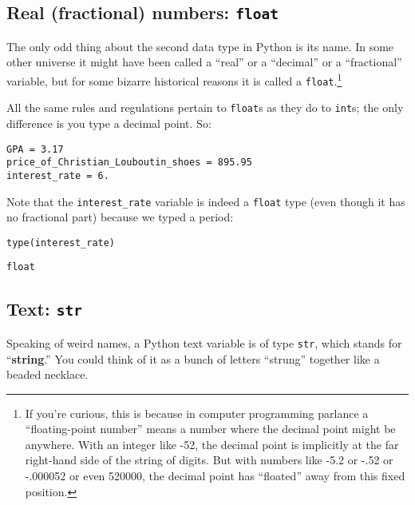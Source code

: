 \subsection{Real (fractional) numbers: \texttt{float}}

The only odd thing about the second data type in Python is its name. In some
other universe it might have been called a ``real'' or a ``decimal'' or a
``fractional'' variable, but for some bizarre historical reasons it is called a
\texttt{float}.\footnote{If you're curious, this is because in computer
programming parlance a ``floating-point number'' means a number where the
decimal point might be anywhere. With an integer like -52, the decimal point is
implicitly at the far right-hand side of the string of digits. But with numbers
like -5.2 or -.52 or -.000052 or even 520000, the decimal point has ``floated''
away from this fixed position.}

All the same rules and regulations pertain to \texttt{float}s as they do to
\texttt{int}s; the only difference is you type a decimal point. So:

\begin{Verbatim}[fontsize=\small,samepage=true,frame=single,framesep=3mm]
GPA = 3.17
price_of_Christian_Louboutin_shoes = 895.95
interest_rate = 6.
\end{Verbatim}

Note that the \texttt{interest\_rate} variable is indeed a \texttt{float} type
(even though it has no fractional part) because we typed a period:

\begin{Verbatim}[fontsize=\small,samepage=true,frame=single,framesep=3mm]
type(interest_rate)
\end{Verbatim}
\begin{Verbatim}[fontsize=\small,samepage=true,frame=leftline,framesep=5mm,framerule=1mm]
float
\end{Verbatim}

\subsection{Text: \texttt{str}}

Speaking of weird names, a Python text variable is of type \texttt{str}, which
stands for ``\textbf{string}.'' You could think of it as a bunch of letters
``strung'' together like a beaded necklace.

